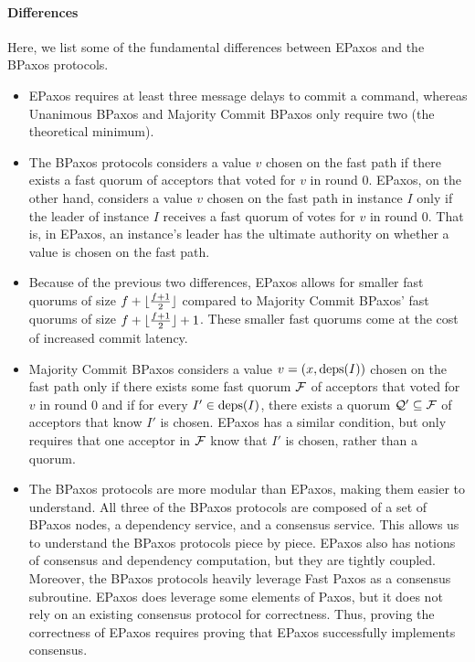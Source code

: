 \paragraph{Differences}
Here, we list some of the fundamental differences between EPaxos and the BPaxos
protocols.
\begin{itemize}
  \item
    EPaxos requires at least three message delays to commit a command, whereas
    Unanimous BPaxos and Majority Commit BPaxos only require two (the
    theoretical minimum).

  \item
    The BPaxos protocols considers a value $v$ chosen on the fast path if there
    exists a fast quorum of acceptors that voted for $v$ in round $0$.  EPaxos,
    on the other hand, considers a value $v$ chosen on the fast path in
    instance $I$ only if the leader of instance $I$ receives a fast quorum of
    votes for $v$ in round $0$.  That is, in EPaxos, an instance's leader has
    the ultimate authority on whether a value is chosen on the fast path.

  \item
    Because of the previous two differences, EPaxos allows for smaller fast
    quorums of size $f + \lfloor\frac{f+1}{2}\rfloor$ compared to Majority Commit
    BPaxos' fast quorums of size $f + \lfloor\frac{f + 1}{2}\rfloor + 1$. These smaller fast quorums
    come at the cost of increased commit latency.

  \item
    Majority Commit BPaxos considers a value $v = (x, \text{deps}(I))$ chosen on the
    fast path only if there exists some fast quorum $\mathcal{F}$ of acceptors
    that voted for $v$ in round $0$ and if for every $I' \in \text{deps}(I)$, there
    exists a quorum $\mathcal{Q}' \subseteq \mathcal{F}$ of acceptors that know
    $I'$ is chosen. EPaxos has a similar condition, but only requires that one
    acceptor in $\mathcal{F}$ know that $I'$ is chosen, rather than a quorum.

  \item
    The BPaxos protocols are more modular than EPaxos, making them easier to
    understand. All three of the BPaxos protocols are composed of a set of
    BPaxos nodes, a dependency service, and a consensus service. This allows us
    to understand the BPaxos protocols piece by piece. EPaxos also has notions
    of consensus and dependency computation, but they are tightly coupled.
    Moreover, the BPaxos protocols heavily leverage Fast Paxos as a consensus
    subroutine. EPaxos does leverage some elements of Paxos, but it does not
    rely on an existing consensus protocol for correctness. Thus, proving the
    correctness of EPaxos requires proving that EPaxos successfully implements
    consensus.
\end{itemize}
